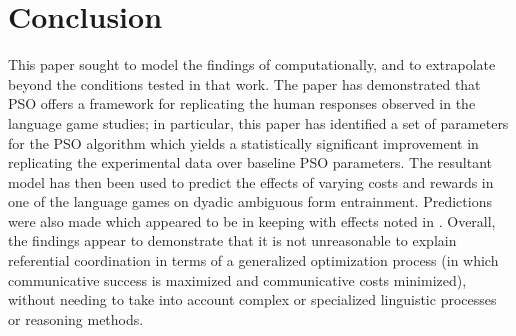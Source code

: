 \documentclass[a4paper,11pt]{article}
\begin{document}
\section{Conclusion}
This paper sought to model the findings of \citeauthor{rohde2012} computationally, and to extrapolate beyond the conditions tested in that work. The paper has demonstrated that PSO offers a framework for replicating the human responses observed in the \citeauthor{rohde2012} language game studies; in particular, this paper has identified a set of parameters for the PSO algorithm which yields a statistically significant improvement in replicating the experimental data over baseline PSO parameters. The resultant model has then been used to predict the effects of varying costs and rewards in one of the \citeauthor{rohde2012} language games on dyadic ambiguous form entrainment. Predictions were also made which appeared to be in keeping with effects noted in \citeauthor{brennan1996}. Overall, the findings appear to demonstrate that it is not unreasonable to explain referential coordination in terms of a generalized optimization process (in which communicative success is maximized and communicative costs minimized), without needing to take into account complex or specialized linguistic processes or reasoning methods.







\end{document}
